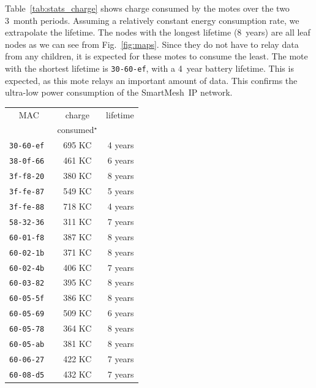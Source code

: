 \documentclass{elsarticle}
\newcommand{\smip}                {SmartMesh~IP\xspace}
\begin{document}

Table~\ref{tab:stats_charge} shows charge consumed by the motes over the two 3~month periods.
Assuming a relatively constant energy consumption rate, we extrapolate the lifetime.
The nodes with the longest lifetime (8~years) are all leaf nodes as we can see from Fig.~\ref{fig:maps}.
Since they do not have to relay data from any children, it is expected for these motes to consume the least.
The mote with the shortest lifetime is {\tt 30-60-ef}, with a 4~year battery lifetime.
This is expected, as this mote relays an important amount of data.
This confirms the ultra-low power consumption of the \smip network.

\begin{table}
\begin{subtable}{.5\textwidth}
    \begin{tabular}{|c|c|r|}
        \toprule
        MAC           &  charge  & lifetime \\
                      & consumed$^\star$ &          \\
        \midrule
        \tt{30-60-ef} &          695 KC &  4 years \\
        \tt{38-0f-66} &          461 KC &  6 years \\
        \tt{3f-f8-20} &          380 KC &  8 years \\
        \tt{3f-fe-87} &          549 KC &  5 years \\
        \tt{3f-fe-88} &          718 KC &  4 years \\
        \tt{58-32-36} &          311 KC &  7 years \\
        \tt{60-01-f8} &          387 KC &  8 years \\
        \tt{60-02-1b} &          371 KC &  8 years \\
        \tt{60-02-4b} &          406 KC &  7 years \\
        \tt{60-03-82} &          395 KC &  8 years \\
        \tt{60-05-5f} &          386 KC &  8 years \\
        \tt{60-05-69} &          509 KC &  6 years \\
        \tt{60-05-78} &          364 KC &  8 years \\
        \tt{60-05-ab} &          381 KC &  8 years \\
        \tt{60-06-27} &          422 KC &  7 years \\
        \tt{60-08-d5} &          432 KC &  7 years \\

\end{tabular}
\end{subtable}
\end{table}
\end{document}

